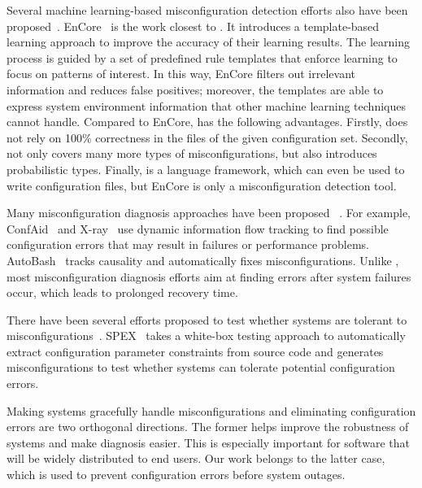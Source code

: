Several machine learning-based misconfiguration detection efforts 
also have been proposed~\cite{yuan11context, zhang14encore}.
EnCore~\cite{zhang14encore} is the work closest to \app.
It introduces a template-based
learning approach to improve the accuracy of their learning results.
The learning process is guided by a set of predefined rule templates
that enforce learning to focus on patterns of interest.
In this way, EnCore filters out irrelevant information and reduces
false positives; moreover, the templates are able to express
system environment information that other machine learning
techniques cannot handle.
Compared to EnCore, \app has the following advantages.
Firstly, \app does not rely on 100\% correctness in the files of the given configuration set. 
Secondly, \app not only covers many more types of 
misconfigurations, but also introduces probabilistic types.
Finally, \app is a language framework, which can 
even be used to write configuration files, but EnCore is only a 
misconfiguration detection tool.

Many misconfiguration diagnosis approaches have been proposed%
~\cite{attariyan10automating, attariyan12x-ray}.
For example, ConfAid~\cite{attariyan10automating} 
and X-ray~\cite{attariyan12x-ray} use dynamic information
flow tracking to find possible configuration errors that may result in
failures or performance problems. AutoBash~\cite{su07autobash} 
tracks causality and automatically fixes 
misconfigurations. Unlike \app, most misconfiguration
diagnosis efforts aim at finding errors after system
failures occur, which leads to prolonged recovery time.

There have been several efforts proposed to test whether systems are 
tolerant to misconfigurations~\cite{xu13do}. 
SPEX~\cite{xu13do} takes a white-box testing approach to automatically
extract configuration parameter constraints from source code and generates 
misconfigurations to test whether systems can tolerate potential
configuration errors.

Making systems gracefully handle misconfigurations and eliminating
configuration errors are two orthogonal directions.
The former helps improve the robustness of systems and make 
diagnosis easier. This is especially important for 
software that will be widely distributed to end users.
Our work belongs to the latter case, which is used to 
prevent configuration errors before system outages.
